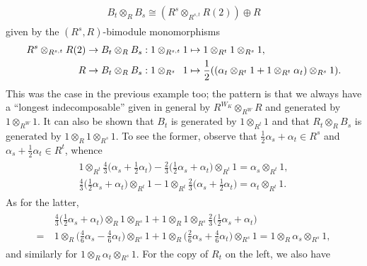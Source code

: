 \begin{example}
\begin{align*}
\begin{split}
B_t \otimes_R B_s \cong (R^s \otimes_{R^{s,t}} R(2)) \oplus R
\end{split}
\end{align*}
\noindent given by the $(R^s, R)$-bimodule monomorphisms
\begin{align*}
\begin{split}
R^s \otimes_{R^{s,t}} R(2) &\to B_t \otimes_R B_s : 1 \otimes_{R^{s,t}} 1 \mapsto 1 \otimes_{R^t} 1 \otimes_{R^s} 1,\\
R &\to B_t \otimes_R B_s : 1 \otimes_{R^{s\hphantom{,t}}} 1 \mapsto \frac{1}{2}((\alpha_t \otimes_{R^t} 1 + 1 \otimes_{R^t} \alpha_t) \otimes_{R^s} 1).
\end{split}
\end{align*}
\newpage
\noindent This was the case in the previous example too; the pattern is that we always have a ``longest indecomposable'' given in general by $R^{W_K} \otimes_{R^W} R$ and generated by $1 \otimes_{R^W} 1$. It can also be shown that $B_t$ is generated by $1 \otimes_{R^t} 1$ and that $R_t \otimes_R B_s$ is generated by $1 \otimes_R 1 \otimes_{R^s} 1$. To see the former, observe that $\frac{1}{2}\alpha_s + \alpha_t \in R^s$ and $\alpha_s + \frac{1}{2}\alpha_t \in R^t$, whence
\begin{align*}
\begin{split}
1 \otimes_{R^t} \frac{4}{3}\Big(\alpha_s + \frac{1}{2}\alpha_t\Big) - \frac{2}{3}\Big(\frac{1}{2}\alpha_s + \alpha_t\Big) \otimes_{R^t} 1 = \alpha_s \otimes_{R^t} 1,\\
\frac{4}{3}\Big(\frac{1}{2}\alpha_s + \alpha_t\Big) \otimes_{R^t} 1 - 1 \otimes_{R^t} \frac{2}{3}\Big(\alpha_s + \frac{1}{2}\alpha_t\Big) = \alpha_t \otimes_{R^t} 1.
\end{split}
\end{align*}
\noindent As for the latter,
\begin{align*}
\begin{split}
&\ \frac{4}{3}\Big(\frac{1}{2}\alpha_s + \alpha_t\Big) \otimes_R 1 \otimes_{R^s} 1 + 1 \otimes_R 1 \otimes_{R^s} \frac{2}{3}\Big(\frac{1}{2}\alpha_s + \alpha_t\Big)\\
=&\ 1 \otimes_R \Big(\frac{4}{6}\alpha_s - \frac{4}{6}\alpha_t\Big) \otimes_{R^s} 1 + 1 \otimes_R \Big(\frac{2}{6}\alpha_s + \frac{4}{6}\alpha_t\Big) \otimes_{R^s} 1 = 1 \otimes_R \alpha_s \otimes_{R^s} 1,
\end{split}
\end{align*}
\noindent and similarly for $1 \otimes_R \alpha_t \otimes_{R^s} 1$. For the copy of $R_t$ on the left, we also have

\end{example}
